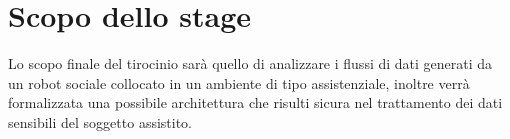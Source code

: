 \section*{Scopo dello stage}
Lo scopo finale del tirocinio sarà quello di analizzare i flussi di dati generati da un robot sociale collocato in un ambiente di tipo assistenziale, inoltre verrà formalizzata una possibile architettura che risulti sicura nel trattamento dei dati sensibili del soggetto assistito.\\

